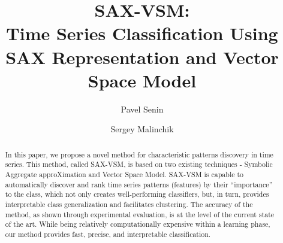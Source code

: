 \documentclass{llncs}
\begin{document}
%
\mainmatter              %
%
\title{SAX-VSM: \\Time Series Classification Using SAX Representation and Vector Space Model}
%
%
\author{Pavel Senin
\and Sergey Malinchik
}
%
%
%


\maketitle              %

\begin{abstract}
In this paper, we propose a novel method for characteristic patterns discovery in 
time series. This method, called SAX-VSM, is based on two existing techniques - 
Symbolic Aggregate approXimation and Vector Space Model. SAX-VSM is capable 
to automatically discover and rank time series patterns (features) by their 
“importance” to the class, which not only creates well-performing classifiers, 
but, in turn, provides interpretable class generalization and facilitates clustering. 
The accuracy of the method, as shown through experimental evaluation, is at the 
level of the current state of the art. 
While being relatively computationally expensive within a learning phase, 
our method provides fast, precise, and interpretable classification.
\end{abstract}
%
\end{document}
